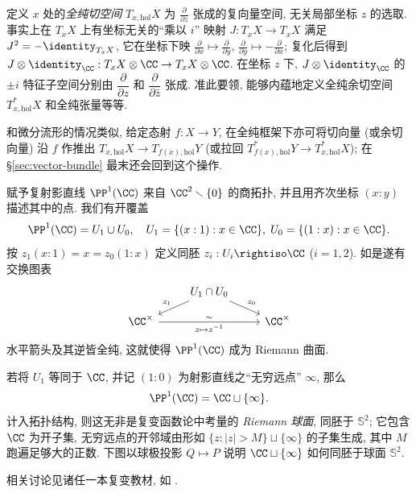 定义 $x$ 处的\emph{全纯切空间} $T_{x, \text{hol}} X$ 为 $\frac{\partial}{\partial z}$ 张成的复向量空间, 无关局部坐标 $z$ 的选取. 事实上在 $T_x X$ 上有坐标无关的``乘以 $i$'' 映射 $J: T_x X \to T_x X$ 满足 $J^2 = -\identity_{T_x X}$, 它在坐标下映 $\frac{\partial}{\partial x} \mapsto \frac{\partial}{\partial y}$, $\frac{\partial}{\partial y} \mapsto -\frac{\partial}{\partial x}$; 复化后得到 $J \otimes \identity_{\CC}: T_x X \otimes \CC \to T_x X \otimes \CC$. 在坐标 $z$ 下, $J \otimes \identity_{\CC}$ 的 $\pm i$ 特征子空间分别由 $\dfrac{\partial}{\partial z}$ 和 $\dfrac{\partial}{\partial \bar{z}}$ 张成. 准此要领, 能够内蕴地定义全纯余切空间 $T^*_{x, \text{hol}} X$ 和全纯张量等等.

和微分流形的情况类似, 给定态射 $f: X \to Y$, 在全纯框架下亦可将切向量 (或余切向量) 沿 $f$ 作推出 $T_{x, \text{hol}} X \to T_{f(x), \text{hol}} Y$ (或拉回 $T^*_{f(x), \text{hol}} Y \to T^*_{x, \text{hol}} X$); 在 \S\ref{sec:vector-bundle} 最末还会回到这个操作.

\begin{example}[复射影直线]\label{eg:P1-cplx}
	赋予复射影直线 $\PP^1(\CC)$ 来自 $\CC^2 \smallsetminus \{0\}$ 的商拓扑, 并且用齐次坐标 $(x:y)$ 描述其中的点. 我们有开覆盖
	\[ \PP^1(\CC) = U_1 \cup U_0, \quad U_1 = \{(x:1) : x \in \CC \}, \; U_0 = \{(1:x) : x \in \CC \}. \]
	按 $z_1(x:1) = x = z_0(1:x)$ 定义同胚 $z_i: U_i \rightiso \CC$ ($i=1,2$). 如是遂有交换图表
	\[\begin{tikzcd}[row sep=small]
		& U_1 \cap U_0 \arrow[ld, "z_1"'] \arrow[rd, "z_0"] \\
		\CC^\times \arrow[rr, "z \mapsto z^{-1}"', "\sim"] & & \CC^\times
	\end{tikzcd}\]
	水平箭头及其逆皆全纯, 这就使得 $\PP^1(\CC)$ 成为 Riemann 曲面.
\end{example}

若将 $U_1$ 等同于 $\CC$, 并记 $(1:0)$ 为射影直线之``无穷远点'' $\infty$, 那么
\[ \PP^1(\CC) = \CC \sqcup \{ \infty \}. \]
计入拓扑结构, 则这无非是复变函数论中考量的 \emph{Riemann 球面}, 同胚于 $\mathbb{S}^2$; 它包含 $\CC$ 为开子集, 无穷远点的开邻域由形如 $\{z: |z| > M \} \sqcup \{\infty\}$ 的子集生成, 其中 $M$ 跑遍足够大的正数. 下图以球极投影 $Q \mapsto P$ 说明 $\CC \sqcup \{\infty\}$ 如何同胚于球面 $\mathbb{S}^2$.
\begin{center}\end{center}
相关讨论见诸任一本复变教材, 如 \cite[\S 1.4]{TW06}.

